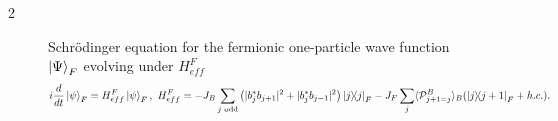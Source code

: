 \documentclass[a0,plainsections]{sciposter}
\begin{document}
\begin{multicols}{2}
\begin{figure}[H]
\begin{shaded}
				Schrödinger equation for the fermionic one-particle wave function $\ket{\Psi}_F$ evolving under $H_{eff}^F$
					\begin{equation}
						i \frac{d}{dt}\ket{\psi}_F = H_{eff}^F \ket{\psi}_F,\ H_{eff}^F = - J_B \sum_{j \text{ odd}} \left(|b_j^* b_{j+1}|^2+|b_j^*b_{j-1}|^2\right) \ketbra{j}{j}_F
									- J_F \sum_j \langle\mathcal{P}_{j+1=j}^B\rangle_B (\ketbra{j}{j+1}_F+h.c.).
						\label{eq:schroedinger_ferm}
					\end{equation}

			\end{shaded}
	\end{figure}


\end{multicols}
\end{document}
